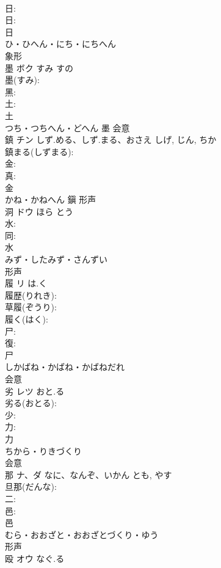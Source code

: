 \documentclass[8pt]{extreport}
\begin{document}
\begin{CJK}{UTF8}{min}
\\	日: 
\\	日: 
\\	日	
\\	ひ・ひへん・にち・にちへん	
\\	象形 
\\	墨	ボク	すみ	すの	
\\	墨(すみ): 
\\	黑: 
\\	土: 
\\	土	
\\	つち・つちへん・どへん	墨	会意 
\\	鎮	チン	しず.める、しず.まる、おさえ	しげ, じん, ちか	
\\	鎮まる(しずまる): 
\\	金: 
\\	真: 
\\	金	
\\	かね・かねへん	鎭	形声 
\\	洞	ドウ	ほら	とう	
\\	水: 
\\	同: 
\\	水	
\\	みず・したみず・さんずい	
\\	形声 
\\	履	リ	は.く		
\\	履歴(りれき): 
\\	草履(ぞうり): 
\\	履く(はく): 
\\	尸: 
\\	復: 
\\	尸	
\\	しかばね・かばね・かばねだれ	
\\	会意 
\\	劣	レツ	おと.る		
\\	劣る(おとる): 
\\	少: 
\\	力: 
\\	力	
\\	ちから・りきづくり	
\\	会意 
\\	那	ナ、ダ	なに、なんぞ、いかん	とも, やす	
\\	旦那(だんな): 
\\	二: 
\\	邑: 
\\	邑	
\\	むら・おおざと・おおざとづくり・ゆう	
\\	形声 
\\	殴	オウ	なぐ.る		

\end{CJK}
\end{document}
